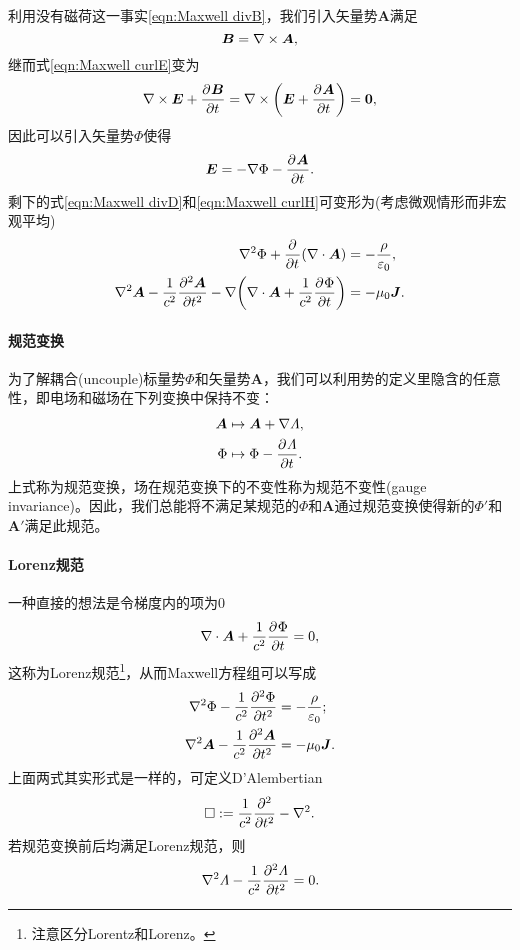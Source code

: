 利用没有磁荷这一事实\eqref{eqn:Maxwell divB}，我们引入矢量势$\bm A$满足 
\begin{equation}
    \label{eqn:curlA}
    \bm B=\curl\bm A,
\end{equation}
继而式\eqref{eqn:Maxwell curlE}变为 
\[
    \curl\bm E+\pv{\bm B}t=\curl\biggkh{\bm E+\pv{\bm A}t}=\bm 0,
\]
因此可以引入矢量势$\Phi$使得
\begin{equation}
    \label{eqn:-nablaPhi-pApt}
    \bm E=-\nabla\Phi-\pv{\bm A}t.
\end{equation}
剩下的式\eqref{eqn:Maxwell divD}和\eqref{eqn:Maxwell curlH}可变形为(考虑微观情形而非宏观平均)
\begin{subequations}
    \begin{align}
        \lapla\Phi+\pp t(\div\bm A)&=-\frac\rho{\varepsilon_0},\\
        \lapla\bm A-\frac1{c^2}\pv[2]{\bm A}t-\nabla\biggkh{\div\bm A+\frac1{c^2}\pv\Phi t}&=-\mu_0\bm J.
    \end{align}
\end{subequations}

\paragraph{规范变换}

为了解耦合(uncouple)标量势$\Phi$和矢量势$\bm A$，我们可以利用势的定义里隐含的任意性，即电场和磁场在下列变换中保持不变：
\begin{align}
    \bm A&\mapsto\bm A+\nabla\varLambda,\\
    \Phi&\mapsto\Phi-\pv\varLambda t.
\end{align}
上式称为规范变换，场在规范变换下的不变性称为规范不变性(gauge invariance)。因此，我们总能将不满足某规范的$\Phi$和$\bm A$通过规范变换使得新的$\Phi'$和$\bm A'$满足此规范。
\paragraph{Lorenz规范}
一种直接的想法是令梯度内的项为0
\begin{equation}
    \div\bm A+\frac1{c^2}\pv\Phi t=0,
\end{equation}
这称为Lorenz规范\footnote{注意区分Lorentz和Lorenz。}，从而Maxwell方程组可以写成
\begin{subequations}
    \begin{align}
        \lapla\Phi-\frac1{c^2}\pv[2]\Phi t&=-\frac\rho{\varepsilon_0};\\
        \lapla\bm A-\frac1{c^2}\pv[2]{\bm A}t&=-\mu_0\bm J.
    \end{align}
\end{subequations}
上面两式其实形式是一样的，可定义D'Alembertian%
\begin{equation}
    \square:=\frac1{c^2}\pp[2]t-\lapla.
\end{equation}
若规范变换前后均满足Lorenz规范，则
\begin{equation}
    \lapla\varLambda-\frac1{c^2}\pv[2]\varLambda t=0.
\end{equation}
